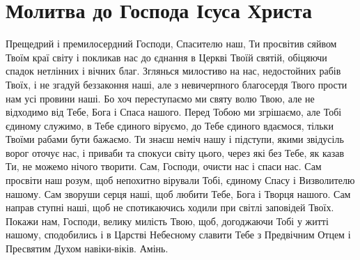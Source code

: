 \documentclass[chapters.tex]{subfiles}
\begin{document}
\section{Молитва до Господа Ісуса Христа}
Прещедрий і премилосердний Господи, Спасителю наш, Ти просвітив сяйвом Твоїм краї світу і покликав нас до єднання в Церкві Твоїй святій, обіцяючи спадок нетлінних і вічних благ. Зглянься милостиво на нас, недостойних рабів Твоїх, і не згадуй беззаконня наші, але з невичерпного благосердя Твого прости нам усі провини наші. Бо хоч переступаємо ми святу волю Твою, але не відходимо від Тебе, Бога і Спаса нашого. Перед Тобою ми згрішаємо, але Тобі єдиному служимо, в Тебе єдиного віруємо, до Тебе єдиного вдаємося, тільки Твоїми рабами бути бажаємо. Ти знаєш неміч нашу і підступи, якими звідусіль ворог оточує нас, і приваби та спокуси світу цього, через які без Тебе, як казав Ти, не можемо нічого творити. Сам, Господи, очисти нас і спаси нас. Сам просвіти наш розум, щоб непохитно вірували Тобі, єдиному Спасу і Визволителю нашому. Сам зворуши серця наші, щоб любити Тебе, Бога і Творця нашого. Сам направ ступні наші, щоб не спотикаючись ходили при світлі заповідей Твоїх. Покажи нам, Господи, велику милість Твою, щоб, догоджаючи Тобі у житті нашому, сподобились і в Царстві Небесному славити Тебе з Предвічним Отцем і Пресвятим Духом навіки-віків. Амінь.
\end{document}
